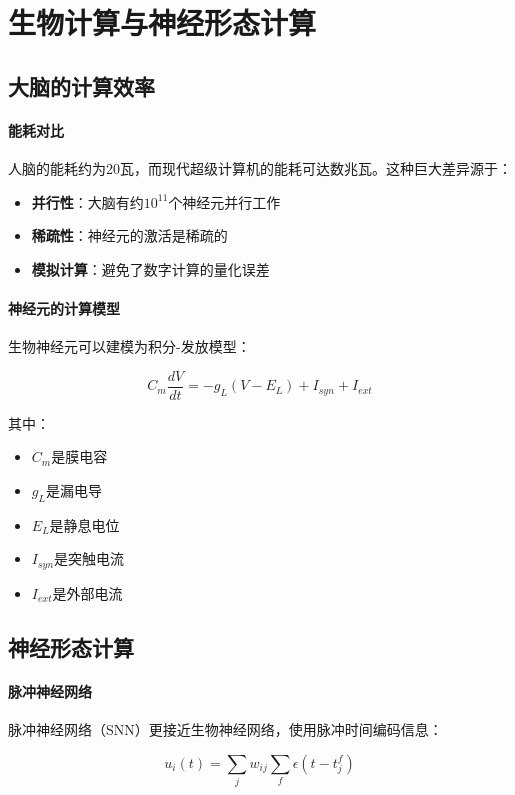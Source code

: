 \section{生物计算与神经形态计算}

\subsection{大脑的计算效率}

\paragraph{能耗对比}
人脑的能耗约为20瓦，而现代超级计算机的能耗可达数兆瓦。这种巨大差异源于：

\begin{itemize}
\item \textbf{并行性}：大脑有约$10^{11}$个神经元并行工作
\item \textbf{稀疏性}：神经元的激活是稀疏的
\item \textbf{模拟计算}：避免了数字计算的量化误差
\end{itemize}

\paragraph{神经元的计算模型}
生物神经元可以建模为积分-发放模型：

$$C_m \frac{dV}{dt} = -g_L(V - E_L) + I_{syn} + I_{ext}$$

其中：
\begin{itemize}
\item $C_m$是膜电容
\item $g_L$是漏电导
\item $E_L$是静息电位
\item $I_{syn}$是突触电流
\item $I_{ext}$是外部电流
\end{itemize}

\subsection{神经形态计算}

\paragraph{脉冲神经网络}
脉冲神经网络（SNN）更接近生物神经网络，使用脉冲时间编码信息：

$$u_i(t) = \sum_j w_{ij} \sum_f \epsilon(t - t_j^f)$$

